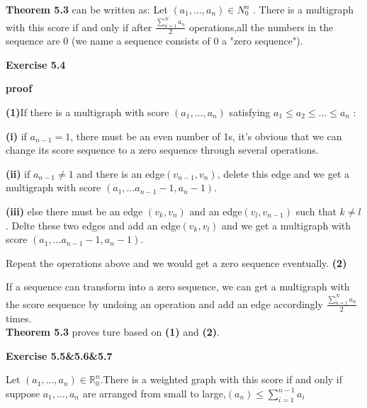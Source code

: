 \documentclass{article} %
\begin{document}
	\textbf{Theorem 5.3} can be written as: Let $(a_1,...,a_n) \in N^{n}_0$ . There is a multigraph with this score if and only if after $\frac{\sum_{n=1}^Na_n}{2}$ operations,all the numbers in the sequence are 0 (we name a sequence consists of 0 a "zero sequence").\par

	\textbf{Exercise 5.4}\par
	\textbf{proof}\par 
	 \textbf{(1)}If there is a multigraph with score $(a_1,...,a_n)$ satisfying $a_1\leq a_2\leq ...\leq a_n$ :\par
	  \textbf{(i)} if $a_{n-1}=1$, there must be an even number of 1s, it's obvious that we can change its score sequence to a zero sequence through several operations.\par
	  \textbf{(ii)} if $a_{n-1}\neq 1$ and there is an edge$(v_{n-1},v_n)$, delete this edge and we get a multigraph with score $(a_1,...a_{n-1}-1,a_n-1)$. \par
	  \textbf{(iii)} else there must be an edge $(v_k,v_n)$ and an edge$(v_l,v_{n-1})$ such that $k\not=l$. Delte these two edges and add an edge$(v_k,v_l)$ and we get a multigraph with score $(a_1,...a_{n-1}-1,a_n-1)$.\par
	  Repeat the operations above and we would get a zero sequence eventually.
	  \textbf{(2)}\par
	  If a sequence can transform into a zero sequence, we can get a multigraph with the score sequence by undoing an operation and add an edge accordingly $\frac{\sum_{n=1}^Na_n}{2}$ times.\\
	  \textbf{Theorem 5.3} proves ture based on \textbf{(1)} and \textbf{(2)}.


\textbf{Exercise 5.5\&5.6\&5.7}\par
      
        Let $(a_1,\dots,a_n) \in \mathbb{R}_0^n$.There is a weighted graph with this score if and only if
        suppose $a_1,\dots,a_n$ are arranged from small to large,$(a_n)\leq \sum_{i=1}^{n-1}a_i$
      
\end{document}
